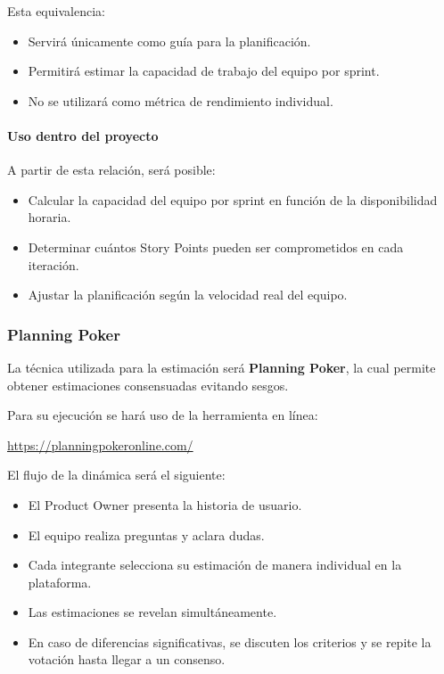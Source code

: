 \documentclass[12pt]{article}
\begin{document}
Esta equivalencia:

\begin{itemize}
    \item Servirá únicamente como guía para la planificación.
    \item Permitirá estimar la capacidad de trabajo del equipo por sprint.
    \item No se utilizará como métrica de rendimiento individual.
\end{itemize}

\paragraph{Uso dentro del proyecto}

A partir de esta relación, será posible:

\begin{itemize}
    \item Calcular la capacidad del equipo por sprint en función de la disponibilidad horaria.
    \item Determinar cuántos Story Points pueden ser comprometidos en cada iteración.
    \item Ajustar la planificación según la velocidad real del equipo.
\end{itemize}

\subsubsection{Planning Poker}

La técnica utilizada para la estimación será \textbf{Planning Poker}, la cual permite obtener estimaciones consensuadas evitando sesgos.

Para su ejecución se hará uso de la herramienta en línea:

\begin{center}
\url{https://planningpokeronline.com/}
\end{center}

El flujo de la dinámica será el siguiente:

\begin{itemize}
    \item El Product Owner presenta la historia de usuario.
    \item El equipo realiza preguntas y aclara dudas.
    \item Cada integrante selecciona su estimación de manera individual en la plataforma.
    \item Las estimaciones se revelan simultáneamente.
    \item En caso de diferencias significativas, se discuten los criterios y se repite la votación hasta llegar a un consenso.
\end{itemize}
\end{document}
